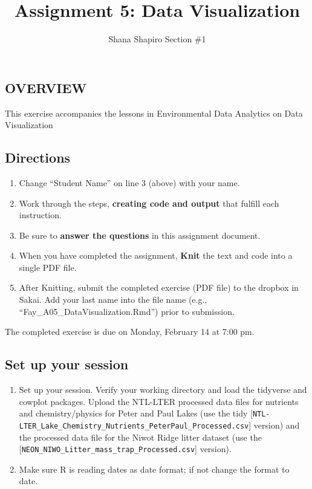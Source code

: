 \documentclass[
]{article}
\title{Assignment 5: Data Visualization}
\author{Shana Shapiro Section \#1}
\date{}
\providecommand{\tightlist}{%
  \setlength{\itemsep}{0pt}\setlength{\parskip}{0pt}}
\begin{document}
\maketitle

\hypertarget{overview}{%
\subsection{OVERVIEW}\label{overview}}

This exercise accompanies the lessons in Environmental Data Analytics on
Data Visualization

\hypertarget{directions}{%
\subsection{Directions}\label{directions}}

\begin{enumerate}
\def\labelenumi{\arabic{enumi}.}
\tightlist
\item
  Change ``Student Name'' on line 3 (above) with your name.
\item
  Work through the steps, \textbf{creating code and output} that fulfill
  each instruction.
\item
  Be sure to \textbf{answer the questions} in this assignment document.
\item
  When you have completed the assignment, \textbf{Knit} the text and
  code into a single PDF file.
\item
  After Knitting, submit the completed exercise (PDF file) to the
  dropbox in Sakai. Add your last name into the file name (e.g.,
  ``Fay\_A05\_DataVisualization.Rmd'') prior to submission.
\end{enumerate}

The completed exercise is due on Monday, February 14 at 7:00 pm.

\hypertarget{set-up-your-session}{%
\subsection{Set up your session}\label{set-up-your-session}}

\begin{enumerate}
\def\labelenumi{\arabic{enumi}.}
\item
  Set up your session. Verify your working directory and load the
  tidyverse and cowplot packages. Upload the NTL-LTER processed data
  files for nutrients and chemistry/physics for Peter and Paul Lakes
  (use the tidy
  {[}\texttt{NTL-LTER\_Lake\_Chemistry\_Nutrients\_PeterPaul\_Processed.csv}{]}
  version) and the processed data file for the Niwot Ridge litter
  dataset (use the
  {[}\texttt{NEON\_NIWO\_Litter\_mass\_trap\_Processed.csv}{]} version).
\item
  Make sure R is reading dates as date format; if not change the format
  to date.
\end{enumerate}
\end{document}
